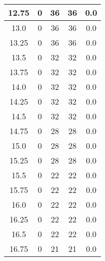 \documentclass[letterpaper, 12pt]{article}
\begin{document}
\begin{longtable}{|c|c|c|c|c|}
\hline
12.75 & 0 & 36 & 36 & 0.0 \\
\hline
13.0 & 0 & 36 & 36 & 0.0 \\
\hline
13.25 & 0 & 36 & 36 & 0.0 \\
\hline
13.5 & 0 & 32 & 32 & 0.0 \\
\hline
13.75 & 0 & 32 & 32 & 0.0 \\
\hline
14.0 & 0 & 32 & 32 & 0.0 \\
\hline
14.25 & 0 & 32 & 32 & 0.0 \\
\hline
14.5 & 0 & 32 & 32 & 0.0 \\
\hline
14.75 & 0 & 28 & 28 & 0.0 \\
\hline
15.0 & 0 & 28 & 28 & 0.0 \\
\hline
15.25 & 0 & 28 & 28 & 0.0 \\
\hline
15.5 & 0 & 22 & 22 & 0.0 \\
\hline
15.75 & 0 & 22 & 22 & 0.0 \\
\hline
16.0 & 0 & 22 & 22 & 0.0 \\
\hline
16.25 & 0 & 22 & 22 & 0.0 \\
\hline
16.5 & 0 & 22 & 22 & 0.0 \\
\hline
16.75 & 0 & 21 & 21 & 0.0 \\
\hline
\end{longtable}
\end{document}

